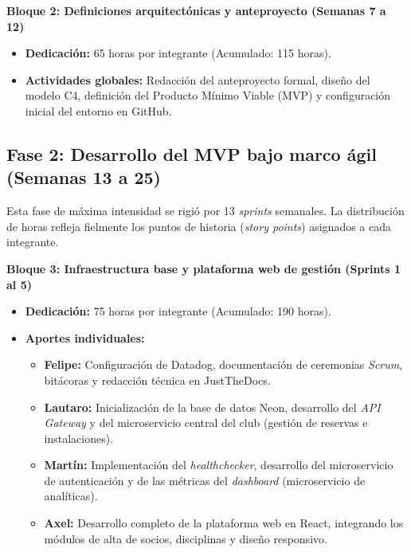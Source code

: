 \textbf{Bloque 2: Definiciones arquitectónicas y anteproyecto (Semanas 7 a 12)}
\begin{itemize}
    \item \textbf{Dedicación:} 65 horas por integrante (Acumulado: 115 horas).
    \item \textbf{Actividades globales:} Redacción del anteproyecto formal, diseño del modelo C4, definición del Producto Mínimo Viable (MVP) y configuración inicial del entorno en GitHub.
\end{itemize}

\subsection{Fase 2: Desarrollo del MVP bajo marco ágil (Semanas 13 a 25)}

Esta fase de máxima intensidad se rigió por 13 \textit{sprints} semanales. La distribución de horas refleja fielmente los puntos de historia (\textit{story points}) asignados a cada integrante.

\textbf{Bloque 3: Infraestructura base y plataforma web de gestión (Sprints 1 al 5)}
\begin{itemize}
    \item \textbf{Dedicación:} 75 horas por integrante (Acumulado: 190 horas).
    \item \textbf{Aportes individuales:}
    \begin{itemize}
        \item \textbf{Felipe:} Configuración de Datadog, documentación de ceremonias \textit{Scrum}, bitácoras y redacción técnica en JustTheDocs.
        \item \textbf{Lautaro:} Inicialización de la base de datos Neon, desarrollo del \textit{API Gateway} y del microservicio central del club (gestión de reservas e instalaciones).
        \item \textbf{Martín:} Implementación del \textit{healthchecker}, desarrollo del microservicio de autenticación y de las métricas del \textit{dashboard} (microservicio de analíticas).
        \item \textbf{Axel:} Desarrollo completo de la plataforma web en React, integrando los módulos de alta de socios, disciplinas y diseño responsivo.
    \end{itemize}
\end{itemize}

